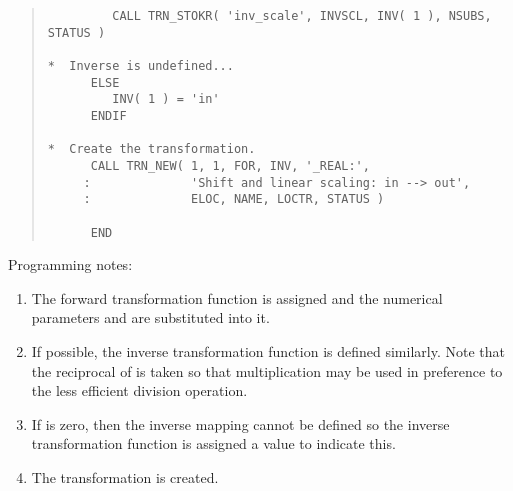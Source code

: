 \begin{quote}
\begin{tabbing}
\verb#         CALL TRN_STOKR( 'inv_scale', INVSCL, INV( 1 ), NSUBS, STATUS )#\\
\verb#                                                       #\\
\verb#*  Inverse is undefined...                             #\\
\verb#      ELSE                                             #\\
\verb#         INV( 1 ) = 'in'                               #\\
\verb#      ENDIF                                            #\\
\verb#                                                       #\\
\verb#*  Create the transformation.                          #\\
\verb#      CALL TRN_NEW( 1, 1, FOR, INV, '_REAL:',          #\\
\verb#     :              'Shift and linear scaling: in --> out',#\\
\verb#     :              ELOC, NAME, LOCTR, STATUS )        #\\
\verb#                                                       #\\
\verb#      END                                              #

\end{tabbing}
\end{quote}

Programming notes:

\begin{enumerate}

\item The forward transformation function is assigned and the numerical
parameters  and  are substituted into it. 

\item If possible, the inverse transformation function is defined similarly.
Note that the reciprocal of  is taken so that multiplication
may be used in preference to the less efficient division operation. 

\item If  is zero, then the inverse mapping cannot be defined
so the inverse transformation function is assigned a value to indicate this.

\item The transformation is created.

\end{enumerate}
\exampledone

